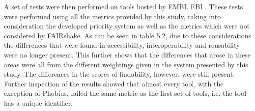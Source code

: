 \documentclass{cisfyp}
\begin{document}
\begin{table}[h]
\caption{Comparison of Findability metrics for BLAST and MEANS.}
\label{tab:my-table}
\end{table}

A set of tests were then performed on tools hosted by EMBL EBI \cite{ebi}. These tests were performed using all the metrics provided by this study, taking into consideration the developed priority system as well as the metrics which were not considered by FAIRshake. As can be seen in table 5.2, due to these considerations the differences that were found in accessibility, interoperability and reusability were no longer present. This further shows that the differences that arose in these areas were all from the different weightings given in the system presented by this study. The differences in the scores of findability, however, were still present. Further inspection of the results showed that almost every tool, with the exception of Phobius, failed the same metric as the first set of tools, i.e, the tool has a unique identifier.
\end{document}
